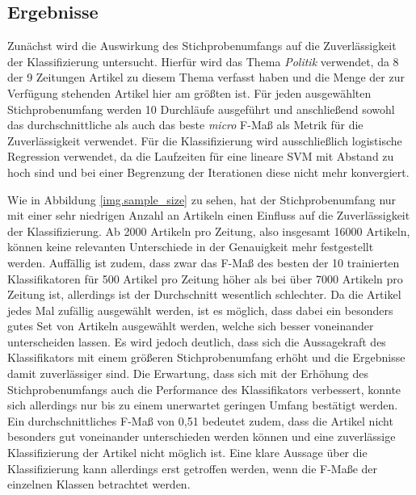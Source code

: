 \subsection{Ergebnisse}
Zunächst wird die Auswirkung des Stichprobenumfangs auf die Zuverlässigkeit der Klassifizierung untersucht. Hierfür wird das Thema \emph{Politik} verwendet, da 8 der 9 Zeitungen Artikel zu diesem Thema verfasst haben und die Menge der zur Verfügung stehenden Artikel hier am größten ist. Für jeden ausgewählten Stichprobenumfang werden 10 Durchläufe ausgeführt und anschließend sowohl das durchschnittliche als auch das beste \textit{micro} F-Maß als Metrik für die Zuverlässigkeit verwendet. Für die Klassifizierung wird ausschließlich logistische Regression verwendet, da die Laufzeiten für eine lineare SVM mit Abstand zu hoch sind und bei einer Begrenzung der Iterationen diese nicht mehr konvergiert.


Wie in Abbildung \ref{img.sample_size} zu sehen, hat der Stichprobenumfang nur mit einer sehr niedrigen Anzahl an Artikeln einen Einfluss auf die Zuverlässigkeit der Klassifizierung. Ab 2000 Artikeln pro Zeitung, also insgesamt 16000 Artikeln, können keine relevanten Unterschiede in der Genauigkeit mehr festgestellt werden. Auffällig ist zudem, dass zwar das F-Maß des besten der 10 trainierten Klassifikatoren für 500 Artikel pro Zeitung höher als bei über 7000 Artikeln pro Zeitung ist, allerdings ist der Durchschnitt wesentlich schlechter. Da die Artikel jedes Mal zufällig ausgewählt werden, ist es möglich, dass dabei ein besonders gutes Set von Artikeln ausgewählt werden, welche sich besser voneinander unterscheiden lassen. Es wird jedoch deutlich, dass sich die Aussagekraft des Klassifikators mit einem größeren Stichprobenumfang erhöht und die Ergebnisse damit zuverlässiger sind. Die Erwartung, dass sich mit der Erhöhung des Stichprobenumfangs auch die Performance des Klassifikators verbessert, konnte sich allerdings nur bis zu einem unerwartet geringen Umfang bestätigt werden. Ein durchschnittliches F-Maß von 0,51 bedeutet zudem, dass die Artikel nicht besonders gut voneinander unterschieden werden können und eine zuverlässige Klassifizierung der Artikel nicht möglich ist. Eine klare Aussage über die Klassifizierung kann allerdings erst getroffen werden, wenn die F-Maße der einzelnen Klassen betrachtet werden.

